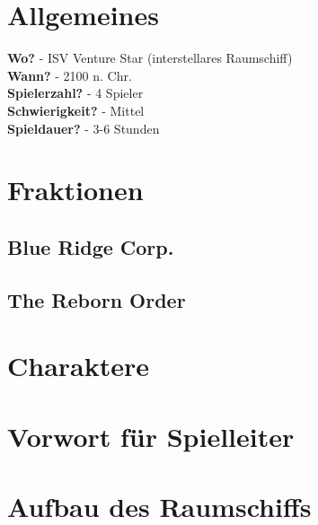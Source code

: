 
\section{Allgemeines}
\textbf{Wo?}            -  ISV Venture Star (interstellares Raumschiff) \\
\textbf{Wann?}          -  2100 n. Chr. \\
\textbf{Spielerzahl?}   -  4 Spieler \\
\textbf{Schwierigkeit?} -  Mittel \\
\textbf{Spieldauer?}    -  3-6 Stunden \\

\section{Fraktionen}

\subsection{Blue Ridge Corp.}



\subsection{The Reborn Order}



\newpage

\section{Charaktere}


\subsection{}


\subsection{}

\newpage

\section{Vorwort für Spielleiter}



\section{Aufbau des Raumschiffs}



